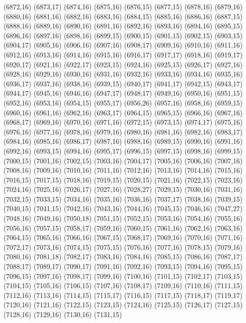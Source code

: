 (6872,16)
(6873,17)
(6874,16)
(6875,16)
(6876,15)
(6877,15)
(6878,16)
(6879,16)
(6880,16)
(6881,16)
(6882,16)
(6883,16)
(6884,15)
(6885,16)
(6886,16)
(6887,15)
(6888,16)
(6889,16)
(6890,16)
(6891,16)
(6892,16)
(6893,16)
(6894,16)
(6895,15)
(6896,16)
(6897,16)
(6898,16)
(6899,15)
(6900,15)
(6901,15)
(6902,15)
(6903,15)
(6904,17)
(6905,16)
(6906,16)
(6907,16)
(6908,17)
(6909,16)
(6910,16)
(6911,16)
(6912,16)
(6913,16)
(6914,16)
(6915,16)
(6916,17)
(6917,17)
(6918,16)
(6919,17)
(6920,17)
(6921,16)
(6922,17)
(6923,15)
(6924,16)
(6925,15)
(6926,17)
(6927,16)
(6928,16)
(6929,16)
(6930,16)
(6931,16)
(6932,16)
(6933,16)
(6934,16)
(6935,16)
(6936,17)
(6937,16)
(6938,16)
(6939,15)
(6940,17)
(6941,17)
(6942,15)
(6943,17)
(6944,17)
(6945,16)
(6946,16)
(6947,17)
(6948,17)
(6949,16)
(6950,16)
(6951,15)
(6952,16)
(6953,16)
(6954,15)
(6955,17)
(6956,26)
(6957,16)
(6958,16)
(6959,15)
(6960,16)
(6961,16)
(6962,16)
(6963,17)
(6964,15)
(6965,15)
(6966,16)
(6967,16)
(6968,17)
(6969,16)
(6970,16)
(6971,16)
(6972,15)
(6973,15)
(6974,17)
(6975,16)
(6976,16)
(6977,16)
(6978,16)
(6979,16)
(6980,16)
(6981,16)
(6982,16)
(6983,17)
(6984,16)
(6985,16)
(6986,17)
(6987,16)
(6988,16)
(6989,15)
(6990,16)
(6991,16)
(6992,16)
(6993,15)
(6994,16)
(6995,17)
(6996,15)
(6997,15)
(6998,16)
(6999,15)
(7000,15)
(7001,16)
(7002,15)
(7003,16)
(7004,17)
(7005,16)
(7006,16)
(7007,16)
(7008,16)
(7009,16)
(7010,16)
(7011,16)
(7012,16)
(7013,16)
(7014,16)
(7015,16)
(7016,15)
(7017,15)
(7018,16)
(7019,15)
(7020,15)
(7021,16)
(7022,15)
(7023,16)
(7024,16)
(7025,16)
(7026,17)
(7027,16)
(7028,27)
(7029,15)
(7030,16)
(7031,16)
(7032,15)
(7033,15)
(7034,16)
(7035,16)
(7036,16)
(7037,17)
(7038,16)
(7039,15)
(7040,15)
(7041,15)
(7042,16)
(7043,16)
(7044,16)
(7045,15)
(7046,16)
(7047,27)
(7048,16)
(7049,16)
(7050,18)
(7051,15)
(7052,15)
(7053,16)
(7054,16)
(7055,16)
(7056,16)
(7057,15)
(7058,17)
(7059,16)
(7060,15)
(7061,16)
(7062,16)
(7063,16)
(7064,15)
(7065,16)
(7066,16)
(7067,15)
(7068,17)
(7069,16)
(7070,16)
(7071,16)
(7072,17)
(7073,16)
(7074,15)
(7075,15)
(7076,16)
(7077,16)
(7078,15)
(7079,16)
(7080,16)
(7081,18)
(7082,17)
(7083,16)
(7084,16)
(7085,15)
(7086,16)
(7087,17)
(7088,17)
(7089,17)
(7090,17)
(7091,16)
(7092,16)
(7093,15)
(7094,16)
(7095,15)
(7096,15)
(7097,16)
(7098,17)
(7099,16)
(7100,16)
(7101,15)
(7102,17)
(7103,15)
(7104,15)
(7105,16)
(7106,15)
(7107,16)
(7108,17)
(7109,16)
(7110,16)
(7111,15)
(7112,16)
(7113,16)
(7114,15)
(7115,17)
(7116,15)
(7117,15)
(7118,17)
(7119,17)
(7120,16)
(7121,16)
(7122,15)
(7123,15)
(7124,16)
(7125,15)
(7126,17)
(7127,15)
(7128,16)
(7129,16)
(7130,16)
(7131,15)
